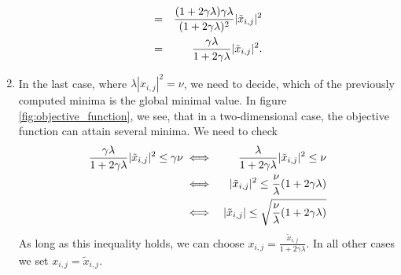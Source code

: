 \documentclass{scrreprt}
\begin{document}
\begin{enumerate}
\begin{eqnarray}
                            &=& \frac{(1 + 2\gamma\lambda)\gamma\lambda}{(1 + 2\gamma\lambda)^{2}} |\tilde{x}_{i,j}|^{2} \notag \\
                            &=& \frac{\gamma\lambda}{1 + 2\gamma\lambda} |\tilde{x}_{i,j}|^{2}. \label{eq:bound_on_p}
                        \end{eqnarray}
                    \item In the last case, where $\lambda |x_{i,j}|^{2} = \nu$, we need to decide, which of the previously computed minima is the global minimal value. In figure \ref{fig:objective_function}, we see, that in a two-dimensional case, the objective function can attain several minima. We need to check
                        \begin{eqnarray}
                            \frac{\gamma\lambda}{1 + 2\gamma\lambda} |\tilde{x}_{i,j}|^{2} \le \gamma \nu &\iff& \frac{\lambda}{1 + 2\gamma\lambda} |\tilde{x}_{i,j}|^{2} \le \nu \label{eq:minimal_energy} \\
                            &\iff& |\tilde{x}_{i,j}|^{2} \le \frac{\nu}{\lambda}(1 + 2\gamma\lambda) \notag \\
                            &\iff& |\tilde{x}_{i,j}| \le \sqrt{\frac{\nu}{\lambda}(1 + 2\gamma\lambda)} \notag
                        \end{eqnarray}
                    As long as this inequality holds, we can choose $x_{i,j} = \frac{\tilde{x}_{i,j}}{1 + 2 \gamma \lambda}$. In all other cases we set $x_{i,j} = \tilde{x}_{i,j}$.
                \end{enumerate}
\end{document}
